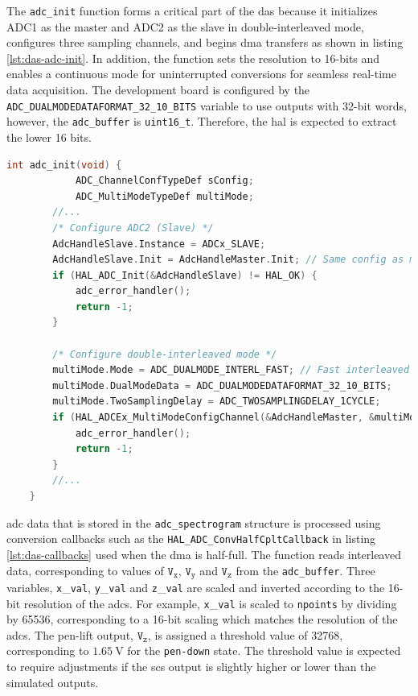 \documentclass[class=report,11pt,crop=false]{standalone}
\begin{document}
	The \texttt{adc\_init} function forms a critical part of the \acrshort{das} because it initializes ADC1 as the master and ADC2 as the slave in double-interleaved mode, configures three sampling channels, and begins \acrshort{dma} transfers as shown in listing \ref{lst:das-adc-init}. In addition, the function sets the resolution to 16-bits and enables a continuous mode for uninterrupted conversions for seamless real-time data acquisition. The development board is configured by the \texttt{ADC\_DUALMODEDATAFORMAT\_32\_10\_BITS} variable to use outputs with 32-bit words, however, the \texttt{adc\_buffer} is \texttt{uint16\_t}. Therefore, the \acrshort{hal} is expected to extract the lower 16 bits. 
	\begin{lstlisting}[language=C, label={lst:das-spectrogram-init-code}, caption={Code snippet of the \texttt{adc\_init} function which configures the double-interleaved operation of the \acrshort{adc}s.}]
	int adc_init(void) {
			ADC_ChannelConfTypeDef sConfig;
			ADC_MultiModeTypeDef multiMode;
		//...
		/* Configure ADC2 (Slave) */
		AdcHandleSlave.Instance = ADCx_SLAVE;
		AdcHandleSlave.Init = AdcHandleMaster.Init; // Same config as master
		if (HAL_ADC_Init(&AdcHandleSlave) != HAL_OK) {
			adc_error_handler();
			return -1;
		}
		
		/* Configure double-interleaved mode */
		multiMode.Mode = ADC_DUALMODE_INTERL_FAST; // Fast interleaved mode
		multiMode.DualModeData = ADC_DUALMODEDATAFORMAT_32_10_BITS;
		multiMode.TwoSamplingDelay = ADC_TWOSAMPLINGDELAY_1CYCLE;
		if (HAL_ADCEx_MultiModeConfigChannel(&AdcHandleMaster, &multiMode) != HAL_OK) {
			adc_error_handler();
			return -1;
		}
		//...
	}
	\end{lstlisting}
	\acrshort{adc} data that is stored in the \texttt{adc\_spectrogram} structure is processed using conversion callbacks such as the \texttt{HAL\_ADC\_ConvHalfCpltCallback} in listing \ref{lst:das-callbacks} used when the \acrshort{dma} is half-full. The function reads interleaved data, corresponding to values of $\texttt{V}_\texttt{x}$, $\texttt{V}_\texttt{y}$ and $\texttt{V}_\texttt{z}$ from the \texttt{adc\_buffer}. Three variables, \texttt{x}\_\texttt{val}, \texttt{y}\_\texttt{val} and \texttt{z}\_\texttt{val} are scaled and inverted according to the 16-bit resolution of the \acrshort{adc}s. For example, \texttt{x}\_\texttt{val} is scaled to \texttt{npoints} by dividing by 65536, corresponding to a 16-bit scaling which matches the resolution of the \acrshort{adc}s. The pen-lift output, $\texttt{V}_\texttt{z}$, is assigned a threshold value of 32768, corresponding to $\SI{1.65}{\volt}$ for the \texttt{pen-down} state. The threshold value is expected to require adjustments if the \acrshort{scs} output is slightly higher or lower than the simulated outputs. 
\end{document}
